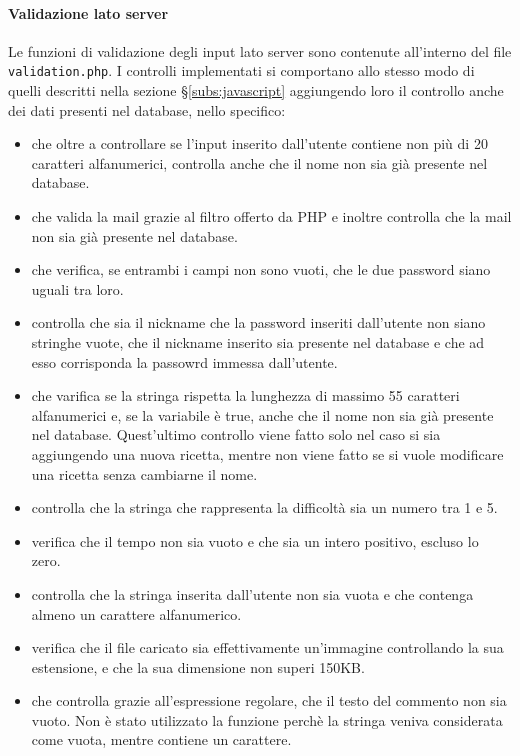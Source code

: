 \paragraph{Validazione lato server}\label{par:validazione_lato_server}
Le funzioni di validazione degli input lato server sono contenute all'interno del file \texttt{validation.php}. I controlli implementati si comportano allo stesso modo di quelli descritti nella sezione \S\ref{subs:javascript} aggiungendo loro il controllo anche dei dati presenti nel database, nello specifico:
\begin{itemize}
	\item {} che oltre a controllare se l'input inserito dall'utente contiene non più di 20 caratteri alfanumerici, controlla anche che il nome non sia già presente nel database.
	\item {} che valida la mail grazie al filtro offerto da PHP e inoltre controlla che la mail non sia già presente nel database.
	\item {} che verifica, se entrambi i campi non sono vuoti, che le due password siano uguali tra loro.
	\item {} controlla che sia il nickname che la password inseriti dall'utente non siano stringhe vuote, che il nickname inserito sia presente nel database e che ad esso corrisponda la passowrd immessa dall'utente.
	\item {} che varifica se la stringa rispetta la lunghezza di massimo 55 caratteri alfanumerici e, se la variabile  è true, anche che il nome non sia già presente nel database. Quest'ultimo controllo viene fatto solo nel caso si sia aggiungendo una nuova ricetta, mentre non viene fatto se si vuole modificare una ricetta senza cambiarne il nome.
	\item {} controlla che la stringa che rappresenta la difficoltà sia un numero tra 1 e 5.
	\item {} verifica che il tempo non sia vuoto e che sia un intero positivo, escluso lo zero.
	\item {} controlla che la stringa inserita dall'utente non sia vuota e che contenga almeno un carattere alfanumerico.
	\item {} verifica che il file caricato sia effettivamente un'immagine controllando la sua estensione, e che la sua dimensione non superi 150KB.
	\item {} che controlla grazie all'espressione regolare, che il testo del commento non sia vuoto. Non è stato utilizzato la funzione  perchè la stringa  veniva considerata come vuota, mentre contiene un carattere.
\end{itemize}
